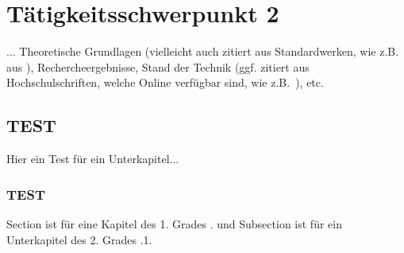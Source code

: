 \chapter{Tätigkeitsschwerpunkt 2}
\label{cha:Tätigkeitsschwerpunkt 2}

... Theoretische Grundlagen (vielleicht auch zitiert aus Standardwerken, wie z.B. aus \autocite{Tipler.2019}), Rechercheergebnisse, Stand der Technik  (ggf. zitiert aus Hochschulschriften, welche Online verfügbar sind, wie z.B.~\autocite{Ziegler.2017}), etc.

\section{TEST}
Hier ein Test für ein Unterkapitel...

\subsection{TEST}
Section ist für eine Kapitel des 1. Grades . und Subsection ist für ein Unterkapitel des 2. Grades .1.
